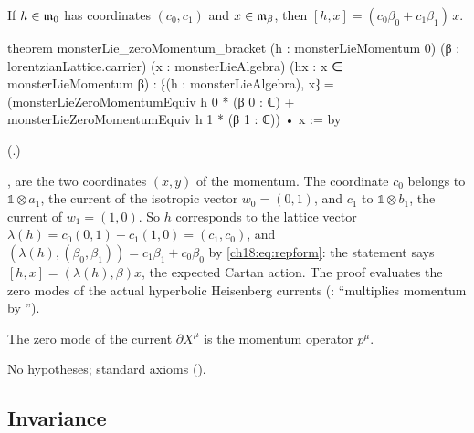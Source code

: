 \begin{theorem}\label{ch18:thm:cartanaction}
If $h\in\mathfrak{m}_0$ has coordinates $(c_0,c_1)$ and $x\in\mathfrak{m}_\beta$, then $[h,x]=(c_0\beta_0+c_1\beta_1)\,x$.
\end{theorem}
\begin{leancode}
theorem monsterLie_zeroMomentum_bracket (h : monsterLieMomentum 0)
    (β : lorentzianLattice.carrier) (x : monsterLieAlgebra) (hx : x ∈ monsterLieMomentum β) :
    ⁅(h : monsterLieAlgebra), x⁆ =
      (monsterLieZeroMomentumEquiv h 0 * (β 0 : ℂ) + monsterLieZeroMomentumEquiv h 1 * (β 1 : ℂ)) •
        x := by
\end{leancode}
(.)
\begin{dictionary}
,  are the two coordinates $(x,y)$ of the momentum.  The coordinate $c_0$ belongs to
$\mathbb 1\otimes a_1$, the current of the isotropic vector $w_0=(0,1)$, and $c_1$ to $\mathbb 1\otimes b_1$, the current of
$w_1=(1,0)$.  So $h$ corresponds to the lattice vector $\lambda(h)=c_0(0,1)+c_1(1,0)=(c_1,c_0)$, and
$(\lambda(h),(\beta_0,\beta_1))=c_1\beta_1+c_0\beta_0$ by \eqref{ch18:eq:repform}: the statement says $[h,x]=(\lambda(h),\beta)x$, the
expected Cartan action.  The proof evaluates the zero modes of the actual hyperbolic Heisenberg currents
(: ``multiplies momentum  by '').
\end{dictionary}
\begin{physics}The zero mode of the current $\partial X^\mu$ is the momentum operator $p^\mu$.\end{physics}
\begin{status}No hypotheses; standard axioms ().\end{status}

\subsection{Invariance}

